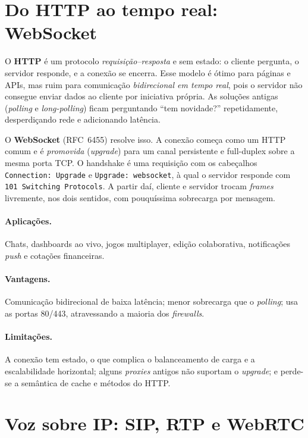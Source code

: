 \documentclass[11pt,a4paper]{article}
\begin{document}
\section{Do HTTP ao tempo real: WebSocket}

O \textbf{HTTP} é um protocolo \emph{requisição--resposta} e sem estado: o cliente pergunta,
o servidor responde, e a conexão se encerra. Esse modelo é ótimo para páginas e APIs, mas
ruim para comunicação \emph{bidirecional em tempo real}, pois o servidor não consegue enviar
dados ao cliente por iniciativa própria. As soluções antigas (\emph{polling} e
\emph{long-polling}) ficam perguntando ``tem novidade?'' repetidamente, desperdiçando rede e
adicionando latência.

O \textbf{WebSocket} (RFC~6455) resolve isso. A conexão começa como um HTTP comum e é
\emph{promovida} (\emph{upgrade}) para um canal persistente e full-duplex sobre a mesma porta
TCP. O handshake é uma requisição com os cabeçalhos \verb|Connection: Upgrade| e
\verb|Upgrade: websocket|, à qual o servidor responde com \verb|101 Switching Protocols|.
A partir daí, cliente e servidor trocam \emph{frames} livremente, nos dois sentidos, com
pouquíssima sobrecarga por mensagem.

\paragraph{Aplicações.} Chats, dashboards ao vivo, jogos multiplayer, edição colaborativa,
notificações \emph{push} e cotações financeiras.

\paragraph{Vantagens.} Comunicação bidirecional de baixa latência; menor sobrecarga que o
\emph{polling}; usa as portas 80/443, atravessando a maioria dos \emph{firewalls}.

\paragraph{Limitações.} A conexão tem estado, o que complica o balanceamento de carga e a
escalabilidade horizontal; alguns \emph{proxies} antigos não suportam o \emph{upgrade}; e
perde-se a semântica de cache e métodos do HTTP.

\section{Voz sobre IP: SIP, RTP e WebRTC}
\end{document}

